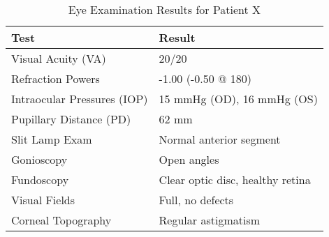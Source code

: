 
\begin{table}[htbp]
    \centering
    \caption{Eye Examination Results for Patient X}
    \label{tab:eye_exam_results}
    \begin{tabular}{ll}
        \toprule
        \textbf{Test} & \textbf{Result} \\
        \midrule
        Visual Acuity (VA) & 20/20 \\
        Refraction Powers & -1.00 (-0.50 @ 180) \\
        Intraocular Pressures (IOP) & 15 mmHg (OD), 16 mmHg (OS) \\
        Pupillary Distance (PD) & 62 mm \\
        Slit Lamp Exam & Normal anterior segment \\
        Gonioscopy & Open angles \\
        Fundoscopy & Clear optic disc, healthy retina \\
        Visual Fields & Full, no defects \\
        Corneal Topography & Regular astigmatism \\
        \bottomrule
    \end{tabular}
\end{table}
